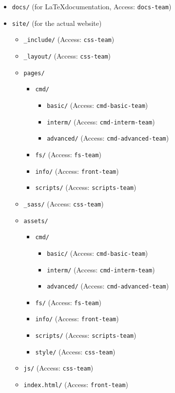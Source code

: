\documentclass[hidelinks,12pt,a4paper,numbers=enddot]{scrartcl}
\begin{document}
\begin{itemize}
\item \texttt{docs/} (for \LaTeX documentation, Access: \texttt{docs-team})
\item \texttt{site/} (for the actual website)
	\begin{itemize}
	\item \texttt{\_include/} (Access: \texttt{css-team})
	\item \texttt{\_layout/} (Access: \texttt{css-team})
	\item \texttt{pages/}
		\begin{itemize}
            \item \texttt{cmd/}
			\begin{itemize}
			\item \texttt{basic/} (Access: \texttt{cmd-basic-team})
			\item \texttt{interm/} (Access: \texttt{cmd-interm-team})
			\item \texttt{advanced/} (Access: \texttt{cmd-advanced-team})
			\end{itemize}
		\item \texttt{fs/} (Access: \texttt{fs-team})
		\item \texttt{info/} (Access: \texttt{front-team})
		\item \texttt{scripts/} (Access: \texttt{scripts-team})
		\end{itemize}
	\item \texttt{\_sass/} (Access: \texttt{css-team})
	\item \texttt{assets/}
		\begin{itemize}
		\item \texttt{cmd/}
			\begin{itemize}
			\item \texttt{basic/} (Access: \texttt{cmd-basic-team})
			\item \texttt{interm/} (Access: \texttt{cmd-interm-team})
			\item \texttt{advanced/} (Access: \texttt{cmd-advanced-team})
			\end{itemize}
		\item \texttt{fs/} (Access: \texttt{fs-team})
		\item \texttt{info/} (Access: \texttt{front-team})
		\item \texttt{scripts/} (Access: \texttt{scripts-team})
		\item \texttt{style/} (Access: \texttt{css-team})
		\end{itemize}
	\item \texttt{js/} (Access: \texttt{css-team})
	\item \texttt{index.html/} (Access: \texttt{front-team})
	\end{itemize}
\end{itemize}
\end{document}
